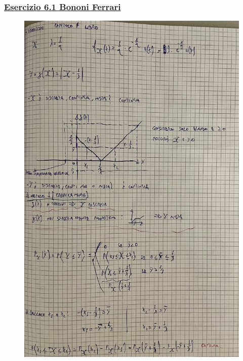 \documentclass{article}
\begin{document}
\subsubsection{\underline{Esercizio 6.1 Bononi Ferrari}}
\begin{figure}[H]
\centering
\includegraphics[scale=0.10]{ese/29.jpeg}
\end{figure}
\end{document}
